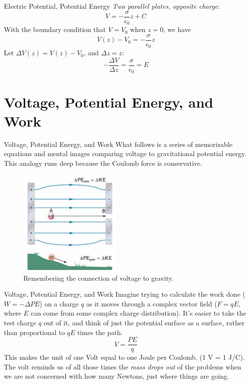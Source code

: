 \documentclass{beamer}
\begin{document}
\begin{frame}{Electric Potential, Potential Energy}
\textit{Two parallel plates, opposite charge}:
\begin{equation}
V = -\frac{\sigma}{\epsilon_0}z + C
\end{equation}
With the boundary condition that $V = V_0$ when $z = 0$, we have
\begin{equation}
V(z) - V_0 = -\frac{\sigma}{\epsilon_0}z
\end{equation}
Let $\Delta V(z) = V(z) - V_0$, and $\Delta z = z$:
\begin{equation}
-\frac{\Delta V}{\Delta z} = \frac{\sigma}{\epsilon_0} =  E
\end{equation}
\end{frame}

\section{Voltage, Potential Energy, and Work}

\begin{frame}{Voltage, Potential Energy, and Work}
\small
What follows is a series of memorizable equations and mental images comparing voltage to gravitational potential energy.  This analogy runs deep because the Coulomb force is conservative.
\begin{figure}
\centering
\includegraphics[width=0.45\textwidth]{figures/hill.png}
\caption{\label{fig:hill} Remembering the connection of voltage to gravity.}
\end{figure}
\end{frame}

\begin{frame}{Voltage, Potential Energy, and Work}
Imagine trying to calculate the work done ($W = -\Delta PE$) on a charge $q$ as it moves through a complex vector field ($F = qE$, where $E$ can come from some complex charge distribution).  It's easier to take the test charge $q$ out of it, and think of just the potential surface as a surface, rather than proportional to $qE$ times the path.
\begin{equation}
V = \frac{PE}{q}
\end{equation}
This makes the unit of one Volt equal to one Joule per Coulomb. (1 V = 1 J/C).  The volt reminds us of all those times the \textit{mass drops out} of the problems when we are not concerned with how many Newtons, just where things are going.
\end{frame}
\end{document}
